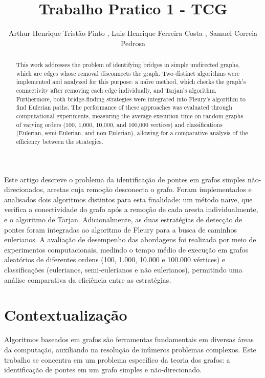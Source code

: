 \documentclass[12pt]{article}
\title{Trabalho Pratico 1 - TCG}
\author{Arthur Henrique Tristão Pinto \inst{1}, Luis Henrique Ferreira Costa \inst{2}, Samuel Correia Pedrosa \inst{3} }
\begin{document}
 

\maketitle

\begin{abstract}
This work addresses the problem of identifying bridges in simple undirected graphs, which are edges whose removal disconnects the graph. Two distinct algorithms were implemented and analyzed for this purpose: a naïve method, which checks the graph's connectivity after removing each edge individually, and Tarjan's algorithm. Furthermore, both bridge-finding strategies were integrated into Fleury's algorithm to find Eulerian paths. The performance of these approaches was evaluated through computational experiments, measuring the average execution time on random graphs of varying orders (100, 1,000, 10,000, and 100,000 vertices) and classifications (Eulerian, semi-Eulerian, and non-Eulerian), allowing for a comparative analysis of the efficiency between the strategies.
\end{abstract}
     
\begin{resumo} 
  Este artigo descreve o problema da identificação de pontes em grafos simples não-direcionados, arestas cuja remoção desconecta o grafo. Foram implementados e analisados dois algoritmos distintos para esta finalidade: um método naïve, que verifica a conectividade do grafo após a remoção de cada aresta individualmente, e o algoritmo de Tarjan. Adicionalmente, as duas estratégias de detecção de pontes foram integradas ao algoritmo de Fleury para a busca de caminhos eulerianos. A avaliação de desempenho das abordagens foi realizada por meio de experimentos computacionais, medindo o tempo médio de execução em grafos aleatórios de diferentes ordens (100, 1.000, 10.000 e 100.000 vértices) e classificações (eulerianos, semi-eulerianos e não eulerianos), permitindo uma análise comparativa da eficiência entre as estratégias.
\end{resumo}

\newpage

\section{Contextualização} 

Algoritmos baseados em grafos são ferramentas fundamentais em diversas áreas da computação, auxiliando na resolução de inúmeros problemas complexos. Este trabalho se concentra em um problema específico da teoria dos grafos: a identificação de pontes em um grafo simples e não-direcionado.
\end{document}
